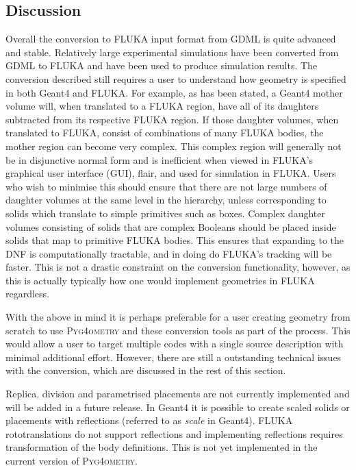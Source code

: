 \documentclass[preprint,12pt]{elsarticle}
\newcommand{\PYGEOMETRY}{\textsc{Pyg4ometry}}
\begin{document}
\subsection{Discussion}
Overall the conversion to FLUKA input format from GDML is quite advanced
and stable. Relatively large experimental simulations have been converted
from GDML to FLUKA and have been used to produce simulation results. The
conversion described still requires a user to understand how geometry is
specified in both Geant4 and FLUKA. For example, as has been stated, a
Geant4 mother volume will, when translated to a FLUKA region, have all of
its daughters subtracted from its respective FLUKA region. If those daughter volumes, when
translated to FLUKA, consist of combinations of many FLUKA bodies, the
mother region can become very complex.  This complex
region will generally not be in disjunctive normal form and is inefficient
when viewed in FLUKA's graphical user interface (GUI), flair, and used for
simulation in FLUKA.  Users who wish to minimise this should ensure that
there are not large numbers of daughter volumes at the same level in the
hierarchy, unless corresponding to solids which translate to simple
primitives such as boxes.  Complex daughter volumes consisting of solids
that are complex Booleans should be placed inside solids that map
to primitive FLUKA bodies.  This ensures that expanding to the DNF is
computationally tractable, and in doing do FLUKA's tracking will be faster.
This is not a drastic constraint on the conversion functionality, however,
as this is actually typically how one would implement geometries in FLUKA
regardless.

With the above in mind it is perhaps preferable for a user creating
geometry from scratch to use \PYGEOMETRY{} and these conversion tools
as part of the process.  This would allow a user to target multiple codes with
a single source description with minimal additional effort.  However, there
are still a  outstanding technical issues with the conversion, which are
discussed in the rest of this section.

Replica, division and parametrised placements are not currently implemented
and will be added in a future release. In Geant4 it is possible to create scaled
solids or placements with reflections (referred to as \emph{scale} in Geant4). FLUKA
rototranslations do not support reflections and implementing reflections
requires transformation of the body definitions. This is not yet implemented
in the current version of \PYGEOMETRY{}.
\end{document}
